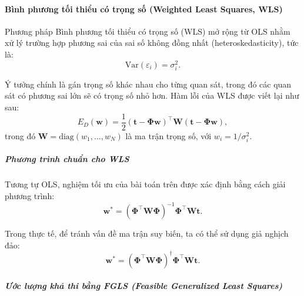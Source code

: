 \paragraph{Bình phương tối thiểu có trọng số (Weighted Least Squares, WLS)}

Phương pháp Bình phương tối thiểu có trọng số (WLS) mở rộng từ OLS nhằm xử lý
trường hợp phương sai của sai số không đồng nhất (heteroskedasticity), tức là:
\begin{equation}
  \mathrm{Var}(\varepsilon_i) = \sigma_i^2.
\end{equation}

Ý tưởng chính là gán trọng số khác nhau cho từng quan sát, trong đó các quan
sát có phương sai lớn sẽ có trọng số nhỏ hơn. Hàm lỗi của WLS được viết lại như
sau: \begin{equation}
  E_D(\boldsymbol{w}) = \frac{1}{2} (\boldsymbol{t} -
  \boldsymbol{\Phi}\boldsymbol{w})^\intercal \boldsymbol{W} (\boldsymbol{t} -
  \boldsymbol{\Phi}\boldsymbol{w}),
\end{equation} trong đó $\boldsymbol{W} = \mathrm{diag}(w_1, \dots, w_N)$ là ma
trận trọng số, với $w_i = 1/\sigma_i^2$.

\subparagraph{Phương trình chuẩn cho WLS}

Tương tự OLS, nghiệm tối ưu của bài toán trên được xác định bằng cách giải
phương trình: \begin{equation}
  \boldsymbol{w}^\ast =
  (\boldsymbol{\Phi}^\intercal \boldsymbol{W} \boldsymbol{\Phi})^{-1}
  \boldsymbol{\Phi}^\intercal \boldsymbol{W} \boldsymbol{t}.
\end{equation}

Trong thực tế, để tránh vấn đề ma trận suy biến, ta có thể sử dụng giả nghịch
đảo: \begin{equation}
  \boldsymbol{w}^\ast =
  (\boldsymbol{\Phi}^\intercal \boldsymbol{W} \boldsymbol{\Phi})^\dagger
  \boldsymbol{\Phi}^\intercal \boldsymbol{W} \boldsymbol{t}.
\end{equation}

\subparagraph{Ước lượng khả thi bằng FGLS (Feasible Generalized Least
Squares)}

